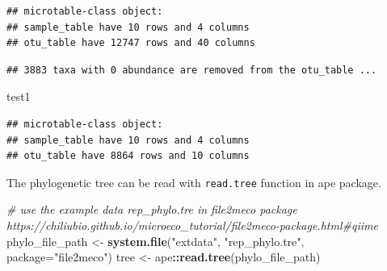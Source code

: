 \documentclass[
]{book}
\newenvironment{Shaded}{\begin{snugshade}}{\end{snugshade}}
\newcommand{\AttributeTok}[1]{\textcolor[rgb]{0.13,0.29,0.53}{#1}}
\newcommand{\CommentTok}[1]{\textcolor[rgb]{0.56,0.35,0.01}{\textit{#1}}}
\newcommand{\DecValTok}[1]{\textcolor[rgb]{0.00,0.00,0.81}{#1}}
\newcommand{\FunctionTok}[1]{\textcolor[rgb]{0.13,0.29,0.53}{\textbf{#1}}}
\newcommand{\NormalTok}[1]{#1}
\newcommand{\OtherTok}[1]{\textcolor[rgb]{0.56,0.35,0.01}{#1}}
\newcommand{\SpecialCharTok}[1]{\textcolor[rgb]{0.81,0.36,0.00}{\textbf{#1}}}
\newcommand{\StringTok}[1]{\textcolor[rgb]{0.31,0.60,0.02}{#1}}
\begin{document}
\begin{Shaded}
\end{Shaded}

\begin{verbatim}
## microtable-class object:
## sample_table have 10 rows and 4 columns
## otu_table have 12747 rows and 40 columns
\end{verbatim}

\begin{Shaded}
\end{Shaded}

\begin{verbatim}
## 3883 taxa with 0 abundance are removed from the otu_table ...
\end{verbatim}

\begin{Shaded}
\begin{Highlighting}[]
\NormalTok{test1}
\end{Highlighting}
\end{Shaded}

\begin{verbatim}
## microtable-class object:
## sample_table have 10 rows and 4 columns
## otu_table have 8864 rows and 10 columns
\end{verbatim}

The phylogenetic tree can be read with \texttt{read.tree} function in ape package.

\begin{Shaded}
\begin{Highlighting}[]
\CommentTok{\# use the example data rep\_phylo.tre in file2meco package https://chiliubio.github.io/microeco\_tutorial/file2meco{-}package.html\#qiime}
\NormalTok{phylo\_file\_path }\OtherTok{\textless{}{-}} \FunctionTok{system.file}\NormalTok{(}\StringTok{"extdata"}\NormalTok{, }\StringTok{"rep\_phylo.tre"}\NormalTok{, }\AttributeTok{package=}\StringTok{"file2meco"}\NormalTok{)}
\NormalTok{tree }\OtherTok{\textless{}{-}}\NormalTok{ ape}\SpecialCharTok{::}\FunctionTok{read.tree}\NormalTok{(phylo\_file\_path)}
\end{Highlighting}
\end{Shaded}
\end{document}
